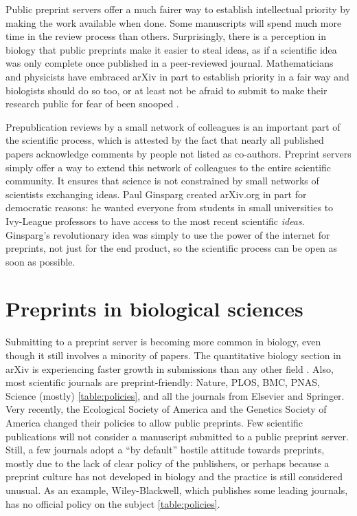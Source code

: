 \documentclass[letterpaper,twocolumn,superscriptaddress,showkeys]{revtex4-1}
\begin{document}
Public preprint servers offer a much fairer way to establish intellectual
priority by making the work available when done. Some manuscripts will spend
much more time in the review process than others. Surprisingly, there is a
perception in biology that public preprints make it easier to steal ideas, as if
a scientific idea was only complete once published in a peer-reviewed journal.
Mathematicians and physicists have embraced arXiv in part to establish priority
in a fair way and biologists should do so too, or at least not be afraid to
submit to make their research public for fear of been snooped \cite{cal12}.

Prepublication reviews by a small network of colleagues is an important part of
the scientific process, which is attested by the fact that nearly all published
papers acknowledge comments by people not listed as co-authors.  Preprint
servers simply offer a way to extend this network of colleagues to the entire
scientific community. It ensures that science is not constrained by small
networks of scientists exchanging ideas.  Paul Ginsparg created arXiv.org in
part for democratic reasons: he wanted everyone from students in small
universities to Ivy-League professors to have access to the most recent
scientific \emph{ideas}.  Ginsparg's revolutionary idea was simply to use the
power of the internet for preprints, not just for the end product, so the
scientific process can be open as soon as possible.

\section{Preprints in biological sciences}

Submitting to a preprint server is becoming more common in biology, even though
it still involves a minority of papers. The quantitative biology section in
arXiv is experiencing faster growth in submissions than any other field
\cite{cal12}. Also, most scientific journals are preprint-friendly: Nature,
PLOS, BMC, PNAS, Science (mostly) \ref{table:policies}, and all the journals
from Elsevier and Springer. Very recently, the Ecological Society of America and
the Genetics Society of America changed their policies to allow public
preprints. Few scientific publications will not consider a manuscript submitted
to a public preprint server.  Still, a few journals adopt a ``by default''
hostile attitude towards preprints, mostly due to the lack of clear policy of
the publishers, or perhaps because a preprint culture has not developed in
biology and the practice is still considered unusual. As an example,
Wiley-Blackwell, which publishes some leading journals, has no official policy
on the subject \ref{table:policies}.
\end{document}
